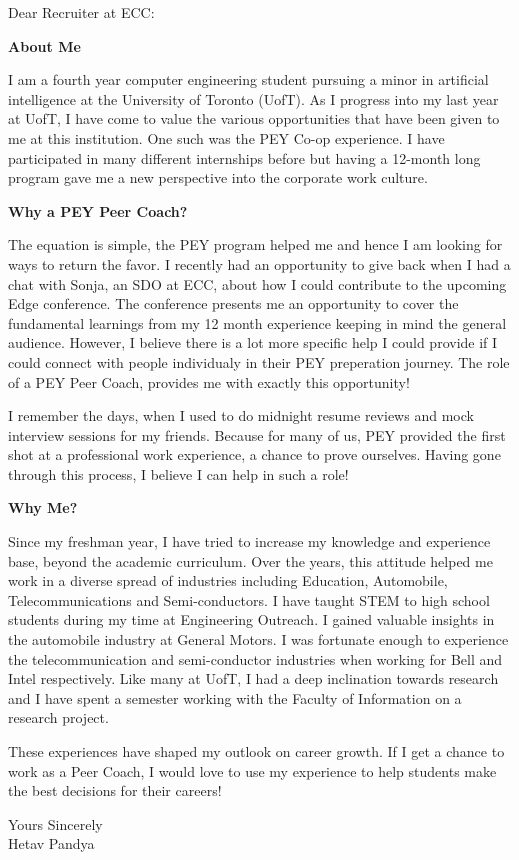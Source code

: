 \documentclass[a4paper,english]{friggeri-letter}
\begin{document}




\opening{Dear Recruiter at ECC:}

\textbf{About Me}

I am a fourth year computer engineering student pursuing a minor in artificial intelligence at the University of Toronto (UofT).
As I progress into my last year at UofT, I have come to value the various opportunities that have been given to me at this institution. 
One such was the PEY Co-op experience. I have participated in many different internships before but having a 12-month long program gave me a new perspective into the corporate work culture.

\textbf{Why a PEY Peer Coach?}

The equation is simple, the PEY program helped me and hence I am looking for ways to return the favor. 
I recently had an opportunity to give back when I had a chat with Sonja, an SDO at ECC, about how I could contribute to the upcoming Edge conference.
The conference presents me an opportunity to cover the fundamental learnings from my 12 month experience keeping in mind the general audience.
However, I believe there is a lot more specific help I could provide if I could connect with people individualy in their PEY preperation journey. 
The role of a PEY Peer Coach, provides me with exactly this opportunity!

I remember the days, when I used to do midnight resume reviews and mock interview sessions for my friends. 
Because for many of us, PEY provided the first shot at a professional work experience, a chance to prove ourselves.
Having gone through this process, I believe I can help in such a role! 

\textbf{Why Me?}

Since my freshman year, I have tried to increase my knowledge and experience base, beyond the academic curriculum. 
Over the years, this attitude helped me work in a diverse spread of industries including Education, Automobile, Telecommunications and Semi-conductors.
I have taught STEM to high school students during my time at Engineering Outreach. 
I gained valuable insights in the automobile industry at General Motors.
I was fortunate enough to experience the telecommunication and semi-conductor industries when working for Bell and Intel respectively.
Like many at UofT, I had a deep inclination towards research and I have spent a semester working with the Faculty of Information on a research project.

These experiences have shaped my outlook on career growth. 
If I get a chance to work as a Peer Coach, I would love to use my experience to help students make the best decisions for their careers!


\vspace*{0.1cm}
\closing{
   Yours Sincerely\\
   Hetav Pandya}
\end{document}
